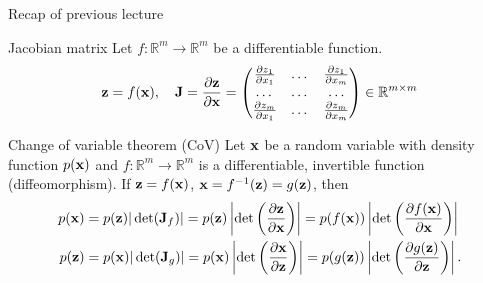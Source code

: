 

\begin{frame}
\titlepage
\end{frame}
\begin{frame}{Recap of previous lecture}
	\begin{block}{Jacobian matrix}
		Let $f: \mathbb{R}^m \rightarrow \mathbb{R}^m$ be a differentiable function.
		\[
		\mathbf{z} = f(\mathbf{x}), \quad 
		\mathbf{J} =  \frac{\partial \mathbf{z}}{\partial \mathbf{x}} =
		\begin{pmatrix}
			\frac{\partial z_1}{\partial x_1} & \dots & \frac{\partial z_1}{\partial x_m} \\
			\dots & \dots & \dots \\ 
			\frac{\partial z_m}{\partial x_1} & \dots & \frac{\partial z_m}{\partial x_m}
		\end{pmatrix} \in \mathbb{R}^{m \times m}
		\]
		\vspace{-0.3cm}
	\end{block}
	\begin{block}{Change of variable theorem (CoV)}
		Let $\mathbf{x}$ be a random variable with density function $p(\mathbf{x})$ and $f: \mathbb{R}^m \rightarrow \mathbb{R}^m$ is a differentiable, invertible function (diffeomorphism). If $\mathbf{z} = f(\mathbf{x})$, $\mathbf{x} = f^{-1}(\mathbf{z}) = g(\mathbf{z})$, then
		\begin{align*}
			p(\mathbf{x}) &= p(\mathbf{z}) |\det(\mathbf{J}_f)| = p(\mathbf{z}) \left|\det \left(  \frac{\partial \mathbf{z}}{\partial \mathbf{x}} \right) \right| = p(f(\mathbf{x})) \left|\det \left(  \frac{\partial f(\mathbf{x})}{\partial \mathbf{x}} \right) \right| \\
			p(\mathbf{z}) &= p(\mathbf{x}) |\det(\mathbf{J}_g)|= p(\mathbf{x}) \left|\det \left(  \frac{\partial \mathbf{x}}{\partial \mathbf{z}} \right) \right| = p(g(\mathbf{z})) \left|\det \left(  \frac{\partial g(\mathbf{z})}{\partial \mathbf{z}} \right) \right|.
		\end{align*}
		\vspace{-0.5cm}
	\end{block}
\end{frame}
